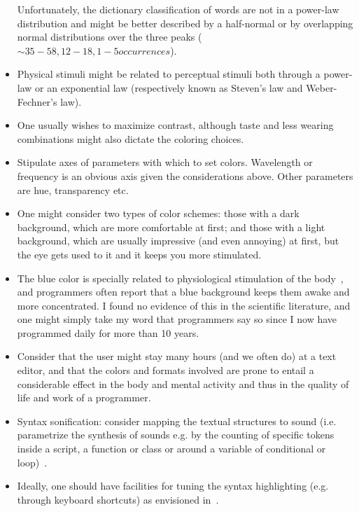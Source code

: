 \documentclass{article}
\begin{document}
\begin{itemize}
  Unfortunately, the dictionary classification of words are not in a
    power-law distribution and might be better described by a half-normal or by
overlapping normal distributions over the three peaks ($\sim35-58,
12-18, 1-5 occurrences$).
  \item Physical stimuli might be related to perceptual stimuli both 
    through a power-law or an exponential law (respectively known
    as Steven's law and Weber-Fechner's law).
  \item One usually wishes to maximize contrast,
  although taste and less wearing combinations might
  also dictate the coloring choices.
  \item Stipulate axes of parameters with which to set colors.
  Wavelength or frequency is an obvious axis given the considerations
  above.
  Other parameters are hue, transparency etc.
  \item One might consider two types of color schemes: those with a dark background,
  which are more comfortable at first; and those with a light background,
  which are usually impressive (and even annoying) at first,
  but the eye gets used to it and it keeps you more stimulated.
\item The blue color is specially related to physiological
  stimulation of the body~\cite{blue,blue2},
    and programmers often report that a blue background keeps them
    awake and more concentrated.
    I found no evidence of this in the scientific literature,
    and one might simply take my word that programmers say so
    since I now have programmed daily for more than 10 years.
  \item Consider that the user might stay many hours (and we often do)
  at a text editor, and that the colors and formats involved are
  prone to entail a considerable effect in the body and mental
  activity and thus in the quality of life and work of a programmer.
  \item Syntax sonification: consider mapping the textual structures
  to sound (i.e. parametrize the synthesis of sounds e.g. 
    by the counting of specific tokens inside a script, a function or
    class or around a variable of conditional or
    loop)~\cite{mass}.
  \item Ideally, one should have facilities for tuning 
    the syntax highlighting (e.g. through keyboard shortcuts)
  as envisioned in~\cite{vimArt}.
\end{itemize}
\end{document}
